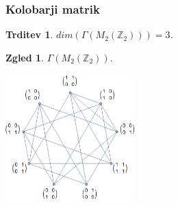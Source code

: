 \documentclass{beamer}
\def\Z{\mathbb{Z}} %
\newtheorem{trditev}{Trditev}
\newtheorem{zgled}{Zgled}
\begin{document}

\begin{frame}
    \frametitle{Kolobarji matrik}
    \begin{trditev}
        $dim(\Gamma(M_2(\Z_2))) = 3$.
    \end{trditev}

    \begin{zgled}
        $\Gamma(M_2(\Z_2))$.
    \end{zgled}
    \begin{center}
        \includegraphics[width=5cm, height=5cm]{m2(2).png}
    \end{center}
    
\end{frame} 

\end{document}
